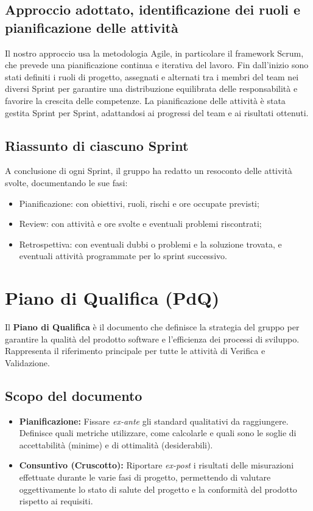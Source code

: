 \documentclass[11pt,a4paper]{article}
\begin{document}
\subsection{Approccio adottato, identificazione dei ruoli e pianificazione delle attività}
Il nostro approccio usa la metodologia Agile, in particolare il framework Scrum, che prevede una pianificazione continua e iterativa del lavoro. 
Fin dall’inizio sono stati definiti i ruoli di progetto, assegnati e alternati tra i membri del team nei diversi Sprint per garantire una distribuzione equilibrata delle responsabilità e favorire la crescita delle competenze.
La pianificazione delle attività è stata gestita Sprint per Sprint, adattandosi ai progressi del team e ai risultati ottenuti. 

\subsection{Riassunto di ciascuno Sprint}
A conclusione di ogni Sprint, il gruppo ha redatto un resoconto delle attività svolte, documentando le sue fasi:
\begin{itemize}
\item Pianificazione: con obiettivi, ruoli, rischi e ore occupate previsti;
\item Review: con attività e ore svolte e eventuali problemi riscontrati;
\item Retrospettiva: con eventuali dubbi o problemi e la soluzione trovata, e eventuali attività programmate per lo sprint successivo. 
\end{itemize}

\newpage

\section{Piano di Qualifica (PdQ)}
Il \textbf{Piano di Qualifica} è il documento che definisce la strategia del gruppo per garantire la qualità del prodotto software e l'efficienza dei processi di sviluppo. Rappresenta il riferimento principale per tutte le attività di Verifica e Validazione.

\subsection{Scopo del documento}
\begin{itemize}
    \item \textbf{Pianificazione:} Fissare \textit{ex-ante} gli standard qualitativi da raggiungere. Definisce quali metriche utilizzare, come calcolarle e quali sono le soglie di accettabilità (minime) e di ottimalità (desiderabili).
    \item \textbf{Consuntivo (Cruscotto):} Riportare \textit{ex-post} i risultati delle misurazioni effettuate durante le varie fasi di progetto, permettendo di valutare oggettivamente lo stato di salute del progetto e la conformità del prodotto rispetto ai requisiti.
\end{itemize}
\end{document}

